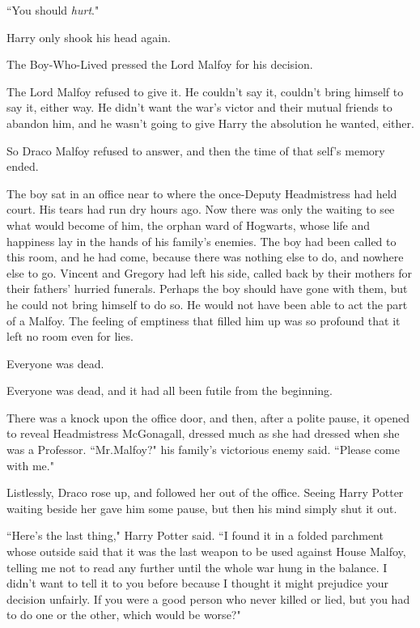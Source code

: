 ``You should \emph{hurt}."

Harry only shook his head again.

The Boy-Who-Lived pressed the Lord Malfoy for his decision.

The Lord Malfoy refused to give it. He couldn't say it, couldn't bring himself to say it, either way. He didn't want the war's victor and their mutual friends to abandon him, and he wasn't going to give Harry the absolution he wanted, either.

So Draco Malfoy refused to answer, and then the time of that self's memory ended.

\later

The boy sat in an office near to where the once-Deputy Headmistress had held court. His tears had run dry hours ago. Now there was only the waiting to see what would become of him, the orphan ward of Hogwarts, whose life and happiness lay in the hands of his family's enemies. The boy had been called to this room, and he had come, because there was nothing else to do, and nowhere else to go. Vincent and Gregory had left his side, called back by their mothers for their fathers' hurried funerals. Perhaps the boy should have gone with them, but he could not bring himself to do so. He would not have been able to act the part of a Malfoy. The feeling of emptiness that filled him up was so profound that it left no room even for lies.

Everyone was dead.

Everyone was dead, and it had all been futile from the beginning.

There was a knock upon the office door, and then, after a polite pause, it opened to reveal Headmistress McGonagall, dressed much as she had dressed when she was a Professor. ``Mr.\?Malfoy?" his family's victorious enemy said. ``Please come with me."

Listlessly, Draco rose up, and followed her out of the office. Seeing Harry Potter waiting beside her gave him some pause, but then his mind simply shut it out.

``Here's the last thing," Harry Potter said. ``I found it in a folded parchment whose outside said that it was the last weapon to be used against House Malfoy, telling me not to read any further until the whole war hung in the balance. I didn't want to tell it to you before because I thought it might prejudice your decision unfairly. If you were a good person who never killed or lied, but you had to do one or the other, which would be worse?"

